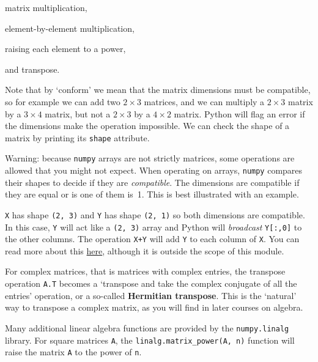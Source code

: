 \noindent
matrix multiplication,


\noindent
element-by-element multiplication,


\noindent
raising each element to a power,

\noindent
and transpose.

\vspace{5mm} Note that by `conform' we mean that the matrix dimensions
must be compatible, so for example we can add two $2\times 3$
matrices, and we can multiply a $2\times 3$ matrix by a $3\times 4$
matrix, but not a $2\times 3$ by a $4\times 2$ matrix. Python will
flag an error if the dimensions make the operation impossible. We can
check the shape of a matrix by printing its \texttt{shape} attribute.


Warning: because \texttt{numpy} arrays are not strictly matrices,
some operations are allowed that you might not expect. When operating
on arrays, \texttt{numpy} compares their shapes to decide if they are
\textit{compatible}. The dimensions are compatible if they are equal
or is one of them is~1. This is best illustrated with an example.


\texttt{X} has shape \texttt{(2, 3)} and \texttt{Y} has shape
\texttt{(2, 1)} so both dimensions are compatible. In this case,
\texttt{Y} will act like a \texttt{(2, 3)} array and Python will
\textit{broadcast} \texttt{Y[:,0]} to the other columns. The operation
\texttt{X+Y} will add \texttt{Y} to each column of \texttt{X}. You can
read more about this
\href{https://numpy.org/doc/stable/user/basics.broadcasting.html}{here},
although it is outside the scope of this module.

For complex matrices, that is matrices with complex entries, 
the transpose operation \texttt{A.T} becomes a `transpose and take the complex
conjugate of all the  entries' operation, or a so-called \textbf{Hermitian 
transpose}.  This is the `natural' way to transpose a complex matrix, 
as you will find in later courses on algebra.

Many additional linear algebra functions are provided by the
\texttt{numpy.linalg} library. For square matrices \texttt{A}, the
\texttt{linalg.matrix\_power(A, n)} function will raise the matrix
\texttt{A} to the power of \texttt{n}.

